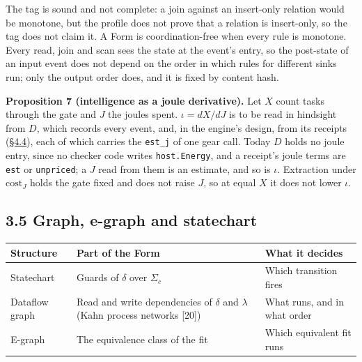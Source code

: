 \documentclass[10pt,letterpaper]{article}
\newcounter{none}
\begin{document}
The tag is sound and not complete: a join against an insert-only
relation would be monotone, but the profile does not prove that a
relation is insert-only, so the tag does not claim it. A Form is
coordination-free when every rule is monotone. Every read, join and scan
sees the state at the event's entry, so the post-state of an input event
does not depend on the order in which rules for different sinks run;
only the output order does, and it is fixed by content hash.

\textbf{Proposition 7 (intelligence as a joule derivative).} Let \(X\)
count tasks through the gate and \(J\) the joules spent.
\(\iota = dX/dJ\) is to be read in hindsight from \(D\), which records
every event, and, in the engine's design, from its receipts
(\href{https://research.openie.dev/papers/rce/\#44-receipts}{§4.4}),
each of which carries the \texttt{est\_j} of one gear call. Today \(D\)
holds no joule entry, since no checker code writes \texttt{host.Energy},
and a receipt's joule terms are \texttt{est} or \texttt{unpriced}; a
\(J\) read from them is an estimate, and so is \(\iota\). Extraction
under \(\mathrm{cost}_J\) holds the gate fixed and does not raise \(J\),
so at equal \(X\) it does not lower \(\iota\).

\subsection{3.5 Graph, e-graph and
statechart}\label{graph-e-graph-and-statechart}

{\def\LTcaptype{none} %
{\footnotesize\setlength{\tabcolsep}{3.8pt}\renewcommand{\arraystretch}{1.15}
\begin{longtable}[]{@{}
  >{\raggedright\arraybackslash}p{}
  >{\raggedright\arraybackslash}p{}
  >{\raggedright\arraybackslash}p{}@{}}
\toprule\noalign{}
\begin{minipage}[b]{\linewidth}\raggedright
\textbf{Structure}
\end{minipage} & \begin{minipage}[b]{\linewidth}\raggedright
\textbf{Part of the Form}
\end{minipage} & \begin{minipage}[b]{\linewidth}\raggedright
\textbf{What it decides}
\end{minipage} \\
\midrule\noalign{}
\endhead
\bottomrule\noalign{}
\endlastfoot
Statechart & Guards of \(\delta\) over \(\Sigma_c\) & Which transition
fires \\
Dataflow graph & Read and write dependencies of \(\delta\) and
\(\lambda\) (Kahn process networks {[}20{]}) & What runs, and in what
order \\
E-graph & The equivalence class of the fit & Which equivalent fit
runs \\
\end{longtable}
}
}
\end{document}
